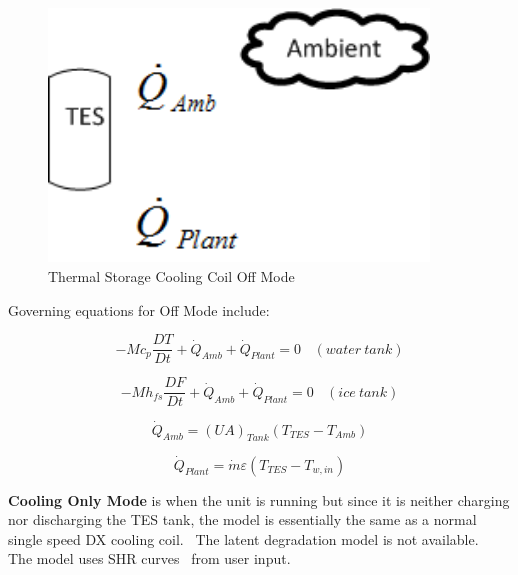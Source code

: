 \begin{figure}[hbtp] %
\centering
\includegraphics[width=0.9\textwidth, height=0.9\textheight, keepaspectratio=true]{media/image4288.png}
\caption{Thermal Storage Cooling Coil Off Mode \protect \label{fig:thermal-storage-cooling-coil-off-mode}}
\end{figure}

Governing equations for Off Mode include:

\begin{equation}
-M{c_p}\frac{{DT}}{{Dt}} + {\dot Q_{Amb}} + {\dot Q_{Plant}} = 0 ~~~~ (water~tank)
\end{equation}

\begin{equation}
-M{h_{fs}}\frac{{DF}}{{Dt}} + {\dot Q_{Amb}} + {\dot Q_{Plant}} = 0 ~~~~ (ice~tank)
\end{equation}

\begin{equation}
{\dot Q_{Amb}} = {\left( {UA} \right)_{Tank}}\left( {{T_{TES}} - {T_{Amb}}} \right)
\end{equation}

\begin{equation}
{\dot Q_{Plant}} = \dot m\varepsilon \left( {{T_{TES}} - {T_{w,in}}} \right)
\end{equation}

\textbf{Cooling Only Mode} is when the unit is running but since it is neither charging nor discharging the TES tank, the model is essentially the same as a normal single speed DX cooling coil.~ The latent degradation model is not available.~ The model uses SHR curves~ from user input.


